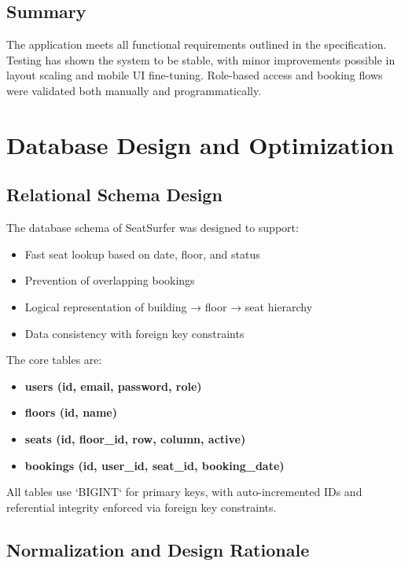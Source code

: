 \documentclass[12pt,a4paper]{report}
\begin{document}
\section{Summary}

The application meets all functional requirements outlined in the specification. Testing has shown the system to be stable, with minor improvements possible in layout scaling and mobile UI fine-tuning. Role-based access and booking flows were validated both manually and programmatically.

\newpage

\chapter{Database Design and Optimization}

\section{Relational Schema Design}

The database schema of SeatSurfer was designed to support:
\begin{itemize}
    \item Fast seat lookup based on date, floor, and status
    \item Prevention of overlapping bookings
    \item Logical representation of building → floor → seat hierarchy
    \item Data consistency with foreign key constraints
\end{itemize}

The core tables are:

\begin{itemize}
    \item \textbf{users (id, email, password, role)}
    \item \textbf{floors (id, name)}
    \item \textbf{seats (id, floor\_id, row, column, active)}
    \item \textbf{bookings (id, user\_id, seat\_id, booking\_date)}
\end{itemize}

All tables use `BIGINT` for primary keys, with auto-incremented IDs and referential integrity enforced via foreign key constraints.

\section{Normalization and Design Rationale}
\end{document}

